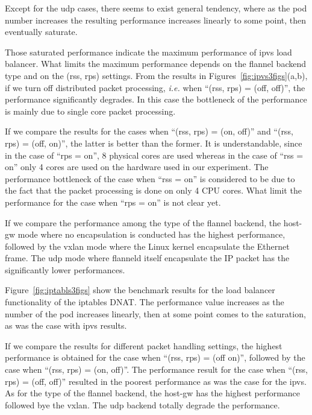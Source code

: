 Except for the udp cases, there seems to exist general tendency, 
where as the pod number increases the resulting performance increases linearly to some point, 
then eventually saturate.

Those saturated performance indicate the maximum performance of ipvs load balancer.
What limits the maximum performance depends on the flannel backend type and on the (rss, rps) settings.
From the results in Figures~\ref{fig:ipvs3figs}(a,b), if we turn off distributed packet processing,
{\it i.e.} when \enquote{(rss, rps) = (off, off)}, the performance significantly degrades. 
In this case the bottleneck of the performance is mainly due to single core packet processing.

If we compare the results for the cases when \enquote{(rss, rps) = (on, off)} and \enquote{(rss, rps) = (off, on)},
the latter is better than the former.
It is understandable, since in the case of \enquote{rps = on}, 8 physical cores are used whereas 
in the case of \enquote{rss = on} only 4 cores are used on the hardware used in our experiment.
The performance bottleneck of the case when \enquote{rss = on} is considered 
to be due to the fact that the packet processing is done on only 4 CPU cores.
What limit the performance for the case when \enquote{rps = on} is not clear yet.

If we compare the performance among the type of the flannel backend, 
the host-gw mode where no encapsulation is conducted has the highest performance,
followed by the vxlan mode where the Linux kernel encapsulate the Ethernet frame.
The udp mode where flanneld itself encapsulate the IP packet has the significantly lower performances.

Figure~\ref{fig:iptabls3figs} show the benchmark results for the load balancer 
functionality of the iptables DNAT. 
The performance value increases as the number of the pod increases linearly, 
then at some point comes to the saturation, as was the case with ipvs results.

If we compare the results for different packet handling settings, the highest performance is 
obtained for the case when \enquote{(rss, rps) = (off on)}, followed by the case when \enquote{(rss, rps) = (on, off)}. 
The performance result for the case when \enquote{(rss, rps) = (off, off)} resulted in the 
poorest performance as was the case for the ipvs.
As for the type of the flannel backend, the host-gw has the highest performance followed 
bye the vxlan. The udp backend totally degrade the performance.

